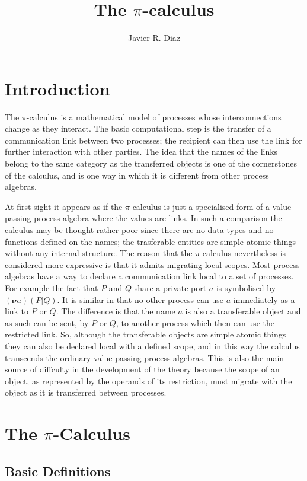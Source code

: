 \documentclass[10pt,a4paper]{article}
\author{Javier R. Diaz}
\title{The $\pi$-calculus}
\newcommand{\resp}[1]{(\boldsymbol{\nu}#1)}
\newcommand{\res}[2]{\resp{#1}#2}
\begin{document}
\maketitle

\section{Introduction}

The $\pi$-calculus is a mathematical model of processes whose interconnections change as they interact. The basic computational step is the transfer of a communication link between two processes; the recipient can then use the link for further interaction with other parties. The idea that the names of the links belong to the same category as the transferred objects is one of the cornerstones of the calculus, and is one way in which it is different from other process algebras. 

At first sight it appears as if the $\pi$-calculus is just a specialised form of a value-passing process algebra where the values are links. In such a comparison the calculus may be thought rather poor since there are no data types and no functions defined on the names; the trasferable entities are simple atomic things without any internal structure. The reason that the $\pi$-calculus nevertheless is considered more expressive is that it admits migrating local scopes. Most process algebras have a way to declare a communication link local to a set of processes. For example the fact that $P$ and $Q$ share a private port $a$ is symbolised by $\res{a}{(P|Q)}$. It is similar in that no other process can use $a$ immediately as a link to $P$ or $Q$. The difference is that the name $a$ is also a transferable object and as such can be sent, by $P$ or $Q$, to another process which then can use the restricted link. So, although the transferable objects are simple atomic things they can also be declared local with a defined scope, and in this way the calculus transcends the ordinary value-passing process algebras. This is also the main source of diffculty in the development of the theory because the scope of an object, as represented by the operands of its restriction, must migrate with the object as it is transferred between processes.

\section{The $\pi$-Calculus}

\subsection{Basic Definitions}
\end{document}
